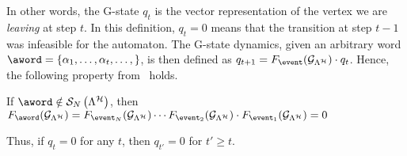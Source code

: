 In other words, the G-state $q_t$ is the vector representation of the vertex we are \emph{leaving} at step $t$.
In this definition, $q_t=0$ means that the transition at step $t-1$ was infeasible for the automaton.
The G-state dynamics, given an arbitrary word $\aword=\{\alpha_1,\dots,\alpha_t,\dots,\}$, is then defined as $q_{t+1} = F_{\event} ( \GG{\Lambda^\strat} )\cdot q_t$.
Hence, the following property from~\cite{xu2012matrix} holds.
\begin{lemma}
    \label{cor:Fseqnotinlambda}
    If $\aword \notin \sset{N}{ \Lambda^\strat }$, then $F_{\aword} ( \GG{\Lambda^\strat} ) =
    F_{\event_N} ( \GG{\Lambda^\strat} )\cdots F_{\event_2} ( \GG{\Lambda^\strat} )\cdot F_{\event_1} ( \GG{\Lambda^\strat} ) = 0$
\end{lemma}
Thus, if $q_t=0$ for any $t$, then $q_{t'}=0$ for $t' \geq t$.
